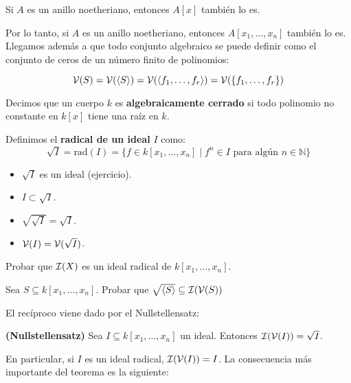 \documentclass[ACGA.tex]{subfiles}
\begin{document}
\begin{teorema}
Si $A$ es un anillo noetheriano, entonces $A[x]$ también lo es.
\end{teorema}

Por lo tanto, si $A$ es un anillo noetheriano, entonces $A[x_1,\dots,x_n]$ también lo es. Llegamos además a que todo conjunto algebraico se puede definir como el conjunto de ceros de un número finito de polinomios:

\[ \mathcal{V}(S) = \mathcal{V}(\langle S \rangle) = \mathcal{V}(\langle f_1,\dots,f_r\rangle) =  \mathcal{V}(\{f_1,\dots,f_r\}) \]

\begin{defi}
Decimos que un cuerpo $k$ es \textbf{algebraicamente cerrado} si todo polinomio no constante en $k[x]$ tiene una raíz en $k$.
\end{defi}

\begin{defi}\label{radical}
Definimos el \textbf{radical de un ideal} $I$ como:
\[ \sqrt{I} = \text{rad}(I) = \{f \in k[x_1,\dots,x_n] \mid f^n \in I \text{ para algún }n \in \mathbb{N}\} \]
\end{defi}

\begin{propi}\mbox{}
\begin{itemize}
	\item $\sqrt{I}$ es un ideal (ejercicio).
	\item $I \subset \sqrt{I}$.
	\item $\sqrt{\sqrt{I}} = \sqrt{I}$.
	\item $\mathcal{V}(I) = \mathcal{V}(\sqrt{I})$.
\end{itemize}
\end{propi}

\begin{ejer} Probar que $\mathcal{I}(X)$ es un ideal radical de $k[x_1,\ldots,x_n]$.
 \end{ejer}

\begin{ejer}
 Sea $S\subseteq k[x_1,\ldots,x_n]$. Probar que $\sqrt{\langle S\rangle}\subseteq \mathcal{I}(\mathcal{V}(S))$
\end{ejer}

El recíproco viene dado por el Nullstellensatz:

\begin{teorema}\label{Null} {\bf (Nullstellensatz)} Sea $I\subseteq k[x_1,\ldots,x_n]$ un ideal. Entonces $\mathcal{I}(\mathcal{V}(I))=\sqrt{I}$.
\end{teorema}

En particular, si $I$ es un ideal radical, $\mathcal{I}(\mathcal{V}(I))=I$. La consecuencia más importante del teorema es la siguiente:
\end{document}
